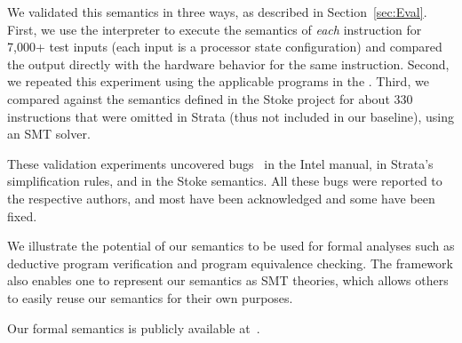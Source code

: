 We validated this semantics in three ways, as described in Section~\ref{sec:Eval}.
%
First, we use the \K interpreter to execute the semantics of \emph{each} instruction for 7,000+ test inputs (each input is a processor state configuration) and compared the output directly with the hardware behavior for the same instruction.
%
Second, we repeated this experiment using the applicable programs in the .  %
%
Third, we compared against the semantics defined in the Stoke project for about 330 instructions that were omitted in Strata (thus not included in our baseline), using an SMT solver.

These validation experiments uncovered bugs~\cite{BugIntel,BugStoke983,BugStoke986} in the Intel manual, in Strata's simplification rules, and in the Stoke semantics.  All these bugs were reported to the respective authors, and most have been acknowledged and some have been fixed.

We illustrate the potential of our semantics to be used for formal analyses such as deductive program verification and program equivalence checking.
The \K framework also enables one to represent our semantics as SMT theories, which allows others to easily reuse our semantics for their own purposes.
%

Our formal semantics is publicly available at~\cite{x86-64-github}.
